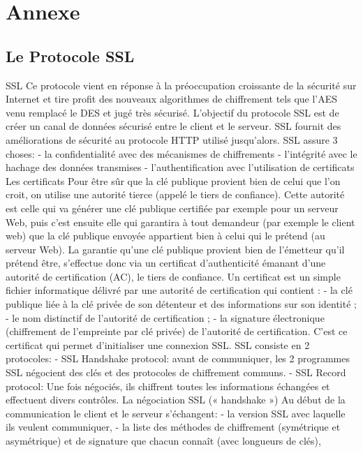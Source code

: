 \chapter*{Annexe}
\section*{Le Protocole SSL}
SSL
Ce protocole vient en réponse à la préoccupation croissante de la sécurité sur Internet et tire profit des nouveaux algorithmes de chiffrement tels que l’AES venu remplacé le DES et jugé très sécurisé. 
L’objectif du protocole SSL est de créer un canal de données sécurisé entre le client et le serveur. SSL fournit des améliorations de sécurité au protocole HTTP utilisé jusqu’alors. 
SSL assure 3 choses:
-	la confidentialité avec des mécanismes de chiffrements
-	l’intégrité avec le hachage des données transmises
-	l’authentification avec l’utilisation de certificats
Les certificats 
Pour être sûr que la clé publique provient bien de celui que l'on croit, on utilise une autorité tierce (appelé le tiers de confiance). Cette autorité est celle qui va générer une clé publique certifiée par exemple pour un serveur Web, puis c'est ensuite elle qui garantira à tout demandeur (par exemple le client web) que la clé publique envoyée appartient bien à celui qui le prétend (au serveur Web).
La garantie qu'une clé publique provient bien de l'émetteur qu'il prétend être, s'effectue donc via un certificat d'authenticité émanant d'une autorité de certification (AC), le tiers de confiance.
Un certificat est un simple fichier informatique délivré par une autorité de certification qui contient :
-	la clé publique liée à la clé privée de son détenteur et des informations sur son identité ;
-	le nom distinctif de l'autorité de certification ;
-	la signature électronique (chiffrement de l'empreinte par clé privée) de l'autorité de certification.
C’est ce certificat qui permet d’initialiser une connexion SSL.
SSL consiste en 2 protocoles:
-	SSL Handshake protocol: avant de communiquer, les 2 programmes SSL négocient des clés et des protocoles de chiffrement communs.
-	SSL Record protocol: Une fois négociés, ils chiffrent toutes les informations échangées et effectuent divers contrôles.
La négociation SSL (« handshake »)
Au début de la communication le client et le serveur s'échangent:
-	la version SSL avec laquelle ils veulent communiquer,
-	la liste des méthodes de chiffrement (symétrique et asymétrique) et de signature que chacun connaît (avec longueurs de clés),
